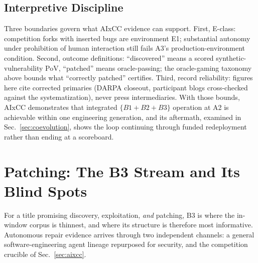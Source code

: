 \documentclass[conference,compsoc]{IEEEtran}
\begin{document}
\subsection{Interpretive Discipline}
Three boundaries govern what AIxCC evidence can support. First, E-class: competition forks with
inserted bugs are environment E1; substantial autonomy under prohibition of human interaction
still fails A3's production-environment condition. Second, outcome definitions: ``discovered''
means a scored synthetic-vulnerability PoV, ``patched'' means oracle-passing; the oracle-gaming
taxonomy above bounds what ``correctly patched'' certifies. Third, record reliability: figures
here cite corrected primaries (DARPA closeout, participant blogs cross-checked against the
systematization), never press intermediaries. With those bounds, AIxCC demonstrates that
integrated $\{B1{+}B2{+}B3\}$ operation at A2 is achievable within one engineering generation, 
and its aftermath, examined in Sec.~\ref{sec:coevolution}, shows the loop continuing
through funded redeployment rather than ending at a scoreboard.

\vspace{6pt}
\section{Patching: The B3 Stream and Its Blind Spots}
\label{sec:patching}
For a title promising discovery, exploitation, \emph{and} patching, B3 is where the in-window
corpus is thinnest, and where its structure is therefore most informative. Autonomous repair
evidence arrives through two independent channels: a general software-engineering agent lineage
repurposed for security, and the competition crucible of Sec.~\ref{sec:aixcc}.
\end{document}
